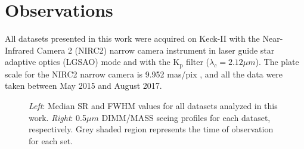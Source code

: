 \documentclass[]{spie}  %
\begin{document}

\section{Observations} \label{sec:observations}
All datasets presented in this work were acquired on Keck-II with the Near-Infrared Camera 2 (NIRC2) narrow camera instrument in laser guide star adaptive optics (LGSAO) mode and with the K$_\textrm{p}$ filter ($\lambda_{c} = 2.12 \mu m$). The plate scale for the NIRC2 narrow camera is 9.952 mas/pix \cite{service:2016a}, and all the data were taken between May 2015 and August 2017.

\begin{figure}[!h]
 \caption{\footnotesize \textit{Left}: Median SR and FWHM values for all datasets analyzed in this work. \textit{Right}: 0.5$\mu m$ DIMM/MASS seeing profiles for each dataset, respectively. Grey shaded region represents the time of observation for each set. \label{fig:dimmmass_datasets}}
\end{figure}
\end{document}
